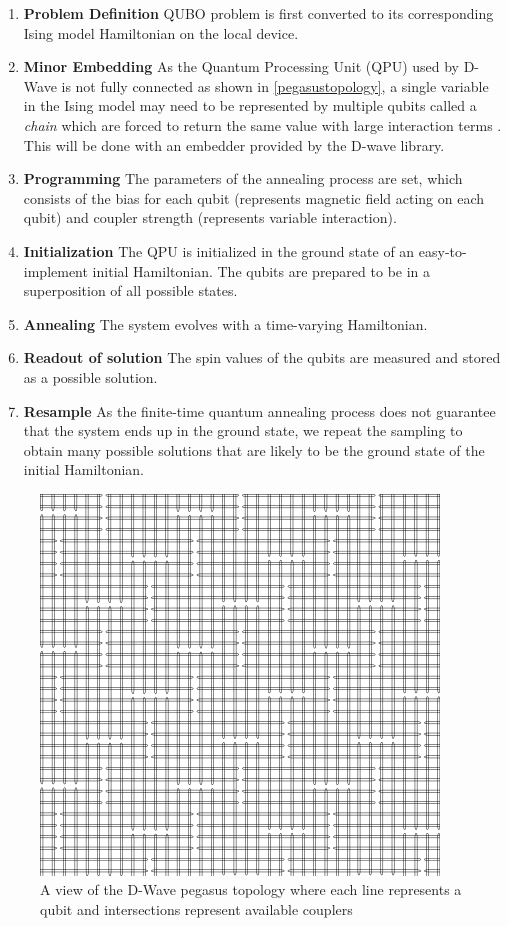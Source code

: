 \begin{enumerate}
    \item \textbf{Problem Definition} QUBO problem is first converted to its corresponding Ising model Hamiltonian on the local device.
    \item \textbf{Minor Embedding} As the Quantum Processing Unit (QPU) used by D-Wave is not fully connected as shown in \autoref{pegasustopology}, a single variable in the Ising model may need to be represented by multiple qubits called a \textit{chain} which are forced to return the same value with large interaction terms \cite{b16}. This will be done with an embedder provided by the D-wave library.
    \item \textbf{Programming} The parameters of the annealing process are set, which consists of the bias for each qubit (represents magnetic field acting on each qubit) and coupler strength (represents variable interaction).
    \item \textbf{Initialization} The QPU is initialized in the ground state of an easy-to-implement initial Hamiltonian. The qubits are prepared to be in a superposition of all possible states.
    \item \textbf{Annealing} The system evolves with a time-varying Hamiltonian.
    \item \textbf{Readout of solution} The spin values of the qubits are measured and stored as a possible solution.
    \item \textbf{Resample} As the finite-time quantum annealing process does not guarantee that the system ends up in the ground state, we repeat the sampling to obtain many possible solutions that are likely to be the ground state of the initial Hamiltonian.
\end{enumerate}
\begin{figure}[h!]
    \centering
    \includegraphics[width=0.5\linewidth]{images/pegasus_topology.png}
    \caption[A view of the D-Wave pegasus topology---each line represents a qubit and intersections represent available couplers]{A view of the D-Wave pegasus topology where each line represents a qubit and intersections represent available couplers~\protect\cite{dwaveadvantage}}
    \label{pegasustopology}
\end{figure}
